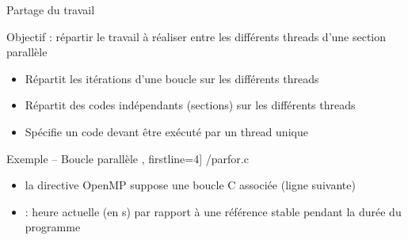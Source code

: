 

\begin {frame} {Partage du travail}
    
    Objectif : répartir le travail à réaliser entre les différents
    threads d'une section parallèle

    \begin {itemize}
	\item {}

	    Répartit les itérations d'une boucle sur les différents
	    threads

	\item {}

	    Répartit des codes indépendants (sections) sur les
	    différents threads

	\item {}

	    Spécifie un code devant être exécuté par un thread unique

    \end {itemize}
\end {frame}


\begin {frame} [fragile] {Exemple \theompexemple{} -- Boucle parallèle}
    \scriptsize\lstmonstyle, firstline=4] {\inc/parfor.c}

    \begin {itemize}
	\item la directive OpenMP  suppose
	    une boucle C associée (ligne suivante)

	\item {} : heure actuelle (en s)
	    par rapport à une référence stable pendant la durée
	    du programme

    \end {itemize}
\end{frame}

